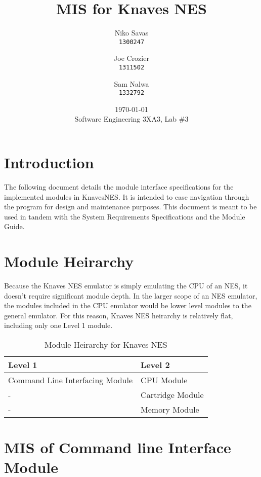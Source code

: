 \documentclass[12pt]{article}
\begin{document}
\title{MIS for Knaves NES}
\date{\today\\
	{\medskip\small Software Engineering 3XA3, Lab \#3}
}
\author{Niko Savas\\
	\texttt{1300247}
	\and
	Joe Crozier\\
	\texttt{1311502}
	\and
	Sam Nalwa\\
	\texttt{1332792}
}

\maketitle
\clearpage

\tableofcontents
\clearpage

\section{Introduction}
	The following document details the module interface specifications for the implemented modules in KnavesNES. It is intended to ease navigation through the program for design and maintenance purposes. This document is meant to be used in tandem with the System Requirements Specifications and the Module Guide.
\section{Module Heirarchy}
	Because the Knaves NES emulator is simply emulating the CPU of an NES, it doesn't require significant module depth. In the larger scope of an NES emulator, the modules included in the CPU emulator would be lower level modules to the general emulator. For this reason, Knaves NES heirarchy is relatively flat, including only one Level 1 module.

	\begin{table}[H]
		\centering
		\begin{tabular}{p{1.5in} p{1.5in}}
			\hline
			Level 1 & Level 2\\
			\hline
			Command Line Interfacing Module & CPU Module\\
			- & Cartridge Module\\
			- & Memory Module \\
		\end{tabular}
		\caption{Module Heirarchy for Knaves NES}
	\end{table}	

\section{MIS of Command line Interface Module}
\end{document}
